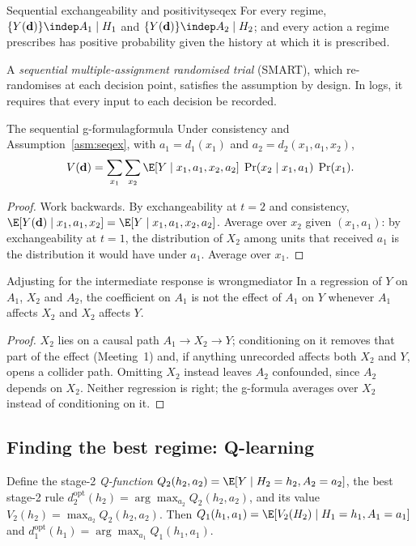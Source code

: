 \documentclass[11pt]{article}
\begin{document}
\begin{assum}{Sequential exchangeability and positivity}{seqex}
For every regime, $\{Y(\mathbf d)\} \indep A_1 \mid H_1$ and $\{Y(\mathbf d)\} \indep A_2 \mid H_2$; and every action a regime prescribes
has positive probability given the history at which it is prescribed.
\end{assum}

A \emph{sequential multiple-assignment randomised trial} (SMART), which re-randomises at each decision point, satisfies the
assumption by design. In logs, it requires that every input to each decision be recorded.

\begin{prop}{The sequential g-formula}{gformula}
Under consistency and Assumption~\ref{asm:seqex}, with $a_1 = d_1(x_1)$ and $a_2 = d_2(x_1, a_1, x_2)$,
\[
  V(\mathbf d) = \sum_{x_1}\sum_{x_2} \E[Y \mid x_1, a_1, x_2, a_2]\;\Pr(x_2 \mid x_1, a_1)\;\Pr(x_1).
\]
\end{prop}
\begin{proof}
Work backwards. By exchangeability at $t = 2$ and consistency,
$\E[Y(\mathbf d) \mid x_1, a_1, x_2] = \E[Y \mid x_1, a_1, x_2, a_2]$. Average over $x_2$ given $(x_1, a_1)$: by exchangeability at
$t = 1$, the distribution of $X_2$ among units that received $a_1$ is the distribution it would have under $a_1$. Average
over $x_1$.
\end{proof}

\begin{prop}{Adjusting for the intermediate response is wrong}{mediator}
In a regression of $Y$ on $A_1$, $X_2$ and $A_2$, the coefficient on $A_1$ is not the effect of $A_1$ on $Y$ whenever $A_1$
affects $X_2$ and $X_2$ affects $Y$.
\end{prop}
\begin{proof}
$X_2$ lies on a causal path $A_1 \to X_2 \to Y$; conditioning on it removes that part of the effect (Meeting~1) and, if
anything unrecorded affects both $X_2$ and $Y$, opens a collider path. Omitting $X_2$ instead leaves $A_2$ confounded,
since $A_2$ depends on $X_2$. Neither regression is right; the g-formula averages over $X_2$ instead of conditioning on it.
\end{proof}

\subsection{Finding the best regime: Q-learning}

Define the stage-2 \emph{Q-function} $Q_2(h_2, a_2) = \E[Y \mid H_2 = h_2, A_2 = a_2]$, the best stage-2 rule
$d_2^{\text{opt}}(h_2) = \arg\max_{a_2} Q_2(h_2, a_2)$, and its value $V_2(h_2) = \max_{a_2} Q_2(h_2, a_2)$. Then
$Q_1(h_1, a_1) = \E[V_2(H_2) \mid H_1 = h_1, A_1 = a_1]$ and $d_1^{\text{opt}}(h_1) = \arg\max_{a_1} Q_1(h_1, a_1)$.
\end{document}
